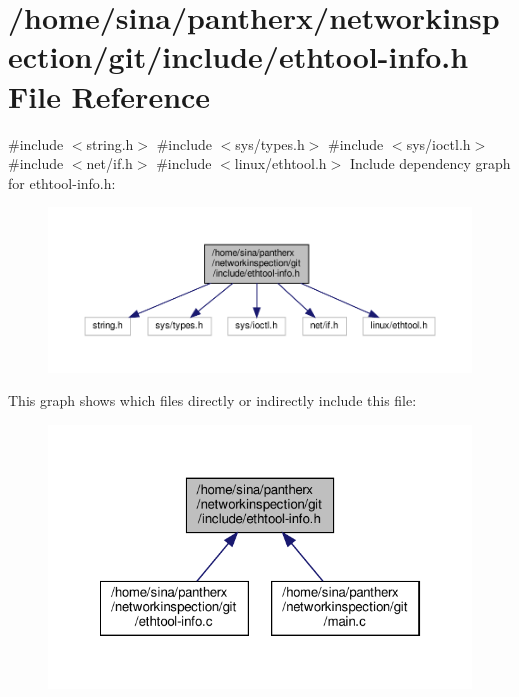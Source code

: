 \hypertarget{ethtool-info_8h}{}\section{/home/sina/pantherx/networkinspection/git/include/ethtool-\/info.h File Reference}
\label{ethtool-info_8h}
{\ttfamily \#include $<$string.\+h$>$}\newline
{\ttfamily \#include $<$sys/types.\+h$>$}\newline
{\ttfamily \#include $<$sys/ioctl.\+h$>$}\newline
{\ttfamily \#include $<$net/if.\+h$>$}\newline
{\ttfamily \#include $<$linux/ethtool.\+h$>$}\newline
Include dependency graph for ethtool-\/info.h\+:\nopagebreak
\begin{figure}[H]
\begin{center}
\leavevmode
\includegraphics[width=350pt]{ethtool-info_8h__incl}
\end{center}
\end{figure}
This graph shows which files directly or indirectly include this file\+:\nopagebreak
\begin{figure}[H]
\begin{center}
\leavevmode
\includegraphics[width=322pt]{ethtool-info_8h__dep__incl}
\end{center}
\end{figure}
